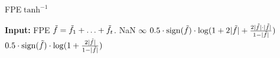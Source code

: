 \begin{algorithm}
    \caption{FPE$\tanh^{-1}$}\label{alg:atanh}
    \begin{algorithmic}[1]
        \STATE \textbf{Input:} FPE $\tilde{f} = \tilde{f}_1 + \ldots + \tilde{f}_t$.
            \RETURN NaN
            \RETURN $\infty$
            \RETURN $0.5 \cdot \operatorname{sign}(\tilde{f}) \cdot \log (1 + 2 |\tilde{f}| + \frac{2 |\tilde{f}| \cdot |\tilde{f}|}{1 - |\tilde{f}|})$
        \ELSE
            \RETURN $0.5 \cdot \operatorname{sign}(\tilde{f}) \cdot \log (1 + \frac{2 |\tilde{f}|}{1 - |\tilde{f}|})$
        \ENDIF
    \end{algorithmic}
\end{algorithm}

